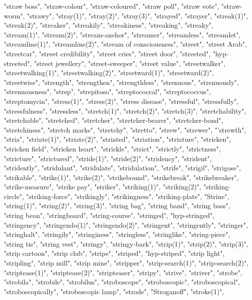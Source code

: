 "straw boss",
"straw-colour",
"straw-coloured",
"straw poll",
"straw vote",
"straw-worm",
"strawy",
"stray(1)",
"stray(2)",
"stray(3)",
"strayed",
"strayer",
"streak(1)",
"streak(2)",
"streaker",
"streakily",
"streakiness",
"streaking",
"streaky",
"stream(1)",
"stream(2)",
"stream-anchor",
"streamer",
"streamless",
"streamlet",
"streamline(1)",
"streamline(2)",
"stream of consciousness",
"street",
"street Arab",
"streetcar",
"street credibility",
"street cries",
"street door",
"streeted",
"hyp-streeted",
"street jewellery",
"street-sweeper",
"street value",
"streetwalker",
"streetwalking(1)",
"streetwalking(2)",
"streetward(1)",
"streetward(2)",
"streetwise",
"strength",
"strengthen",
"strengthless",
"strenuous",
"strenuously",
"strenuousness",
"strep",
"strepitoso",
"streptococcal",
"streptococcus",
"streptomycin",
"stress(1)",
"stress(2)",
"stress disease",
"stressful",
"stressfully",
"stressfulness",
"stressless",
"stretch(1)",
"stretch(2)",
"stretch(3)",
"stretchability",
"stretchable",
"stretched",
"stretcher",
"stretcher-bearer",
"stretcher-bond",
"stretchiness",
"stretch marks",
"stretchy",
"stretto",
"strew",
"strewer",
"'strewth",
"stria",
"striate(1)",
"striate(2)",
"striated",
"striation",
"striature",
"stricken",
"stricken field",
"stricken heart",
"strickle",
"strict",
"strictly",
"strictness",
"stricture",
"strictured",
"stride(1)",
"stride(2)",
"stridency",
"strident",
"stridently",
"stridulant",
"stridulate",
"stridulation",
"strife",
"strigil",
"strigose",
"strikable",
"strike(1)",
"strike(2)",
"strikebound",
"strikebreak",
"strikebreaker",
"strike-measure",
"strike pay",
"striker",
"striking(1)",
"striking(2)",
"striking-circle",
"striking-force",
"strikingly",
"strikingness",
"striking-plate",
"Strine",
"string(1)",
"string(2)",
"string(3)",
"string bag",
"string band",
"string bass",
"string bean",
"stringboard",
"string-course",
"stringed",
"hyp-stringed",
"stringency",
"stringendo(1)",
"stringendo(2)",
"stringent",
"stringently",
"stringer",
"stringhalt",
"stringily",
"stringiness",
"stringless",
"stringlike",
"string-piece",
"string tie",
"string vest",
"stringy",
"stringy-bark",
"strip(1)",
"strip(2)",
"strip(3)",
"strip cartoon",
"strip club",
"stripe",
"striped",
"hyp-striped",
"strip light",
"stripling",
"strip mill",
"strip mine",
"stripper",
"strip-search(1)",
"strip-search(2)",
"striptease(1)",
"striptease(2)",
"stripteaser",
"stripy",
"strive",
"striver",
"strobe",
"strobila",
"strobile",
"strobilus",
"stroboscope",
"stroboscopic",
"stroboscopical",
"stroboscopically",
"stroboscopic lamp",
"strode",
"Stroganoff",
"stroke(1)",
